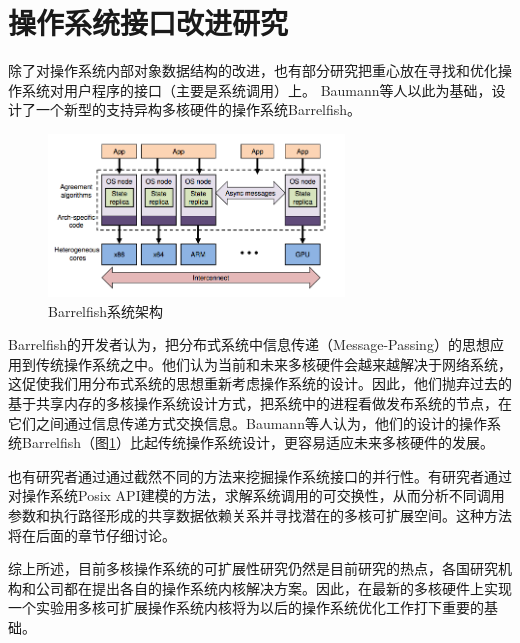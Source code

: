 \section{操作系统接口改进研究}
除了对操作系统内部对象数据结构的改进，也有部分研究把重心放在寻找和优化操作系统对用户程序的接口（主要是系统调用）上。
Baumann等人以此为基础，设计了一个新型的支持异构多核硬件的操作系统Barrelfish\cite{Baumann:2009:MNO:1629575.1629579}。
\begin{figure}[ht]
\centering
\includegraphics[width=0.7\textwidth]{figures/barrelfish.png}
\caption{Barrelfish系统架构\cite{Baumann:2009:MNO:1629575.1629579}}
\label{fig:barrelfish}
\end{figure}

Barrelfish的开发者认为，把分布式系统中信息传递（Message-Passing）的思想应用到传统操作系统之中。他们认为当前和未来多核硬件会越来越解决于网络系统，这促使我们用分布式系统的思想重新考虑操作系统的设计。因此，他们抛弃过去的基于共享内存的多核操作系统设计方式，把系统中的进程看做发布系统的节点，在它们之间通过信息传递方式交换信息。Baumann等人认为，他们的设计的操作系统Barrelfish（图\ref{fig:barrelfish}）比起传统操作系统设计，更容易适应未来多核硬件的发展。

也有研究者通过通过截然不同的方法来挖掘操作系统接口的并行性。有研究者\cite{commuter:2013}通过对操作系统Posix API建模的方法，求解系统调用的可交换性，从而分析不同调用参数和执行路径形成的共享数据依赖关系并寻找潜在的多核可扩展空间。这种方法将在后面的章节仔细讨论。

综上所述，目前多核操作系统的可扩展性研究仍然是目前研究的热点，各国研究机构和公司都在提出各自的操作系统内核解决方案。因此，在最新的多核硬件上实现一个实验用多核可扩展操作系统内核将为以后的操作系统优化工作打下重要的基础。


